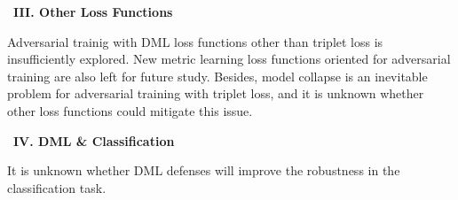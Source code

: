 ~\newline\textbf{III. Other Loss Functions}

Adversarial trainig with DML loss functions other than triplet loss is
insufficiently explored.
%
New metric learning loss functions oriented for adversarial training are also
left for future study.
%
Besides, model collapse is an inevitable problem for adversarial training
with triplet loss, and it is unknown whether other loss functions could
mitigate this issue.


~\newline\textbf{IV. DML \& Classification}

It is unknown whether DML defenses will improve the robustness in the
classification task.

